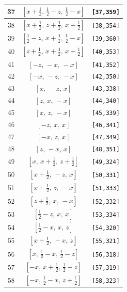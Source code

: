 \documentclass[fleqn,8pt]{jsarticle}
\begin{document}
\begin{longtable}{ccc}
37 & $\left[ x + \frac{1}{2},\, \frac{1}{2} - z,\, \frac{1}{2} - x \right]$ & {\tt [37,359]} \\ \hline
38 & $\left[ x + \frac{1}{2},\, z + \frac{1}{2},\, x + \frac{1}{2} \right]$ & {\tt [38,354]} \\ \hline
39 & $\left[ \frac{1}{2} - z,\, x + \frac{1}{2},\, \frac{1}{2} - x \right]$ & {\tt [39,360]} \\ \hline
40 & $\left[ z + \frac{1}{2},\, x + \frac{1}{2},\, x + \frac{1}{2} \right]$ & {\tt [40,353]} \\ \hline
41 & $\left[ - z,\, - x,\, - x \right]$ & {\tt [41,352]} \\ \hline
42 & $\left[ - x,\, - z,\, - x \right]$ & {\tt [42,350]} \\ \hline
43 & $\left[ x,\, - z,\, x \right]$ & {\tt [43,338]} \\ \hline
44 & $\left[ z,\, x,\, - x \right]$ & {\tt [44,340]} \\ \hline
45 & $\left[ x,\, z,\, - x \right]$ & {\tt [45,339]} \\ \hline
46 & $\left[ - z,\, x,\, x \right]$ & {\tt [46,341]} \\ \hline
47 & $\left[ - x,\, z,\, x \right]$ & {\tt [47,349]} \\ \hline
48 & $\left[ z,\, - x,\, x \right]$ & {\tt [48,351]} \\ \hline
49 & $\left[ x,\, x + \frac{1}{2},\, z + \frac{1}{2} \right]$ & {\tt [49,324]} \\ \hline
50 & $\left[ x + \frac{1}{2},\, - z,\, x \right]$ & {\tt [50,331]} \\ \hline
51 & $\left[ x + \frac{1}{2},\, z,\, - x \right]$ & {\tt [51,333]} \\ \hline
52 & $\left[ z + \frac{1}{2},\, x,\, - x \right]$ & {\tt [52,332]} \\ \hline
53 & $\left[ \frac{1}{2} - z,\, x,\, x \right]$ & {\tt [53,334]} \\ \hline
54 & $\left[ \frac{1}{2} - x,\, x,\, z \right]$ & {\tt [54,320]} \\ \hline
55 & $\left[ x + \frac{1}{2},\, - x,\, z \right]$ & {\tt [55,321]} \\ \hline
56 & $\left[ x,\, \frac{1}{2} - x,\, \frac{1}{2} - z \right]$ & {\tt [56,318]} \\ \hline
57 & $\left[ - x,\, x + \frac{1}{2},\, \frac{1}{2} - z \right]$ & {\tt [57,319]} \\ \hline
58 & $\left[ - x,\, \frac{1}{2} - x,\, z + \frac{1}{2} \right]$ & {\tt [58,323]} \\ \hline

\end{longtable}
\end{document}
